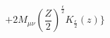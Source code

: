 \begin{equation}+2\textit{M}_{\mu\nu}\left(\frac{Z}{2}\right)^{\frac{\epsilon}{2}}K_{\frac{\epsilon}{2}}(z)\biggr\}
  \end{equation}

